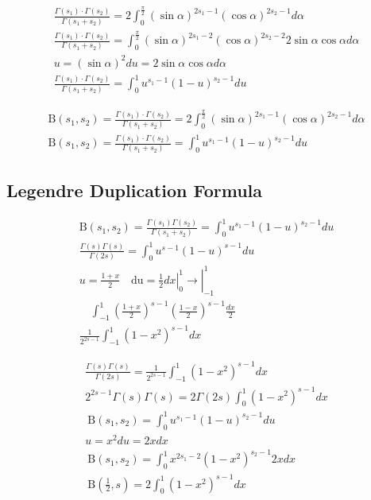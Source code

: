 	$$
	\begin{gathered}
		\frac{\Gamma\left(s_1\right) \cdot \Gamma\left(s_2\right)}{\Gamma\left(s_1+s_2\right)}=2 \int_0^{\frac{\pi}{2}}(\sin \alpha)^{2 s_1-1}(\cos \alpha)^{2 s_2-1} d \alpha \\
		\frac{\Gamma\left(s_1\right) \cdot \Gamma\left(s_2\right)}{\Gamma\left(s_1+s_2\right)}=\int_0^{\frac{\pi}{2}}(\sin \alpha)^{2 s_1-2}(\cos \alpha)^{2 s_2-2} 2 \sin \alpha \cos \alpha d \alpha \\
		u=(\sin \alpha)^2 d u=2 \sin \alpha \cos \alpha d \alpha \\
		\frac{\Gamma\left(s_1\right) \cdot \Gamma\left(s_2\right)}{\Gamma\left(s_1+s_2\right)}=\int_0^1 u^{s_1-1}(1-u)^{s_2-1} d u
	\end{gathered}
	$$
	
	$$
	\begin{gathered}
		\mathrm{B}\left(s_1, s_2\right)=\frac{\Gamma\left(s_1\right) \cdot \Gamma\left(s_2\right)}{\Gamma\left(s_1+s_2\right)}=2 \int_0^{\frac{\pi}{2}}(\sin \alpha)^{2 s_1-1}(\cos \alpha)^{2 s_2-1} d \alpha \\
		\mathrm{B}\left(s_1, s_2\right)=\frac{\Gamma\left(s_1\right) \cdot \Gamma\left(s_2\right)}{\Gamma\left(s_1+s_2\right)}=\int_0^1 u^{s_1-1}(1-u)^{s_2-1} d u
	\end{gathered}
	$$
	
	\subsection{Legendre Duplication Formula}
	
	$$
	\begin{gathered}
		\mathrm{B}\left(s_1, s_2\right)=\frac{\Gamma\left(s_1\right) \Gamma\left(s_2\right)}{\Gamma\left(s_1+s_2\right)}=\int_0^1 u^{s_1-1}(1-u)^{s_2-1} d u \\
		\frac{\Gamma(s) \Gamma(s)}{\Gamma(2 s)}=\int_0^1 u^{s-1}(1-u)^{s-1} d u \\
		u=\frac{1+x}{2} \quad \mathrm{du}=\left.\left.\frac{1}{2} d x\right|_0 ^1 \rightarrow\right|_{-1} ^1 \\
		\quad \int_{-1}^1\left(\frac{1+x}{2}\right)^{s-1}\left(\frac{1-x}{2}\right)^{s-1} \frac{d x}{2} \\
		\frac{1}{2^{2 s-1}} \int_{-1}^1\left(1-x^2\right)^{s-1} d x
	\end{gathered}
	$$
	
	$$
	\begin{gathered}
		\frac{\Gamma(s) \Gamma(s)}{\Gamma(2 s)}=\frac{1}{2^{2 s-1}} \int_{-1}^1\left(1-x^2\right)^{s-1} d x \\
		2^{2 s-1} \Gamma(s) \Gamma(s)=2 \Gamma(2 s) \int_0^1\left(1-x^2\right)^{s-1} d x \\
		\mathrm{~B}\left(s_1, s_2\right)=\int_0^1 u^{s_1-1}(1-u)^{s_2-1} d u \\
		u=x^2 d u=2 x d x \\
		\mathrm{~B}\left(s_1, s_2\right)=\int_0^1 x^{2 s_1-2}\left(1-x^2\right)^{s_2-1} 2 x d x \\
		\mathrm{~B}\left(\frac{1}{2}, s\right)=2 \int_0^1\left(1-x^2\right)^{s-1} d x
	\end{gathered}
	$$
	
